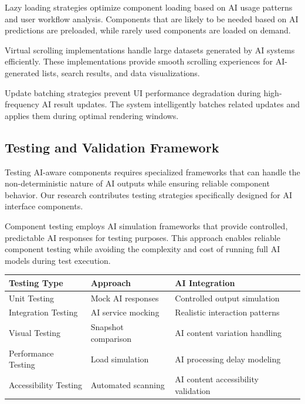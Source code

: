 Lazy loading strategies optimize component loading based on AI usage patterns and user workflow analysis. Components that are likely to be needed based on AI predictions are preloaded, while rarely used components are loaded on demand.

Virtual scrolling implementations handle large datasets generated by AI systems efficiently. These implementations provide smooth scrolling experiences for AI-generated lists, search results, and data visualizations.

Update batching strategies prevent UI performance degradation during high-frequency AI result updates. The system intelligently batches related updates and applies them during optimal rendering windows.

\subsection*{Testing and Validation Framework}

Testing AI-aware components requires specialized frameworks that can handle the non-deterministic nature of AI outputs while ensuring reliable component behavior. Our research contributes testing strategies specifically designed for AI interface components.

Component testing employs AI simulation frameworks that provide controlled, predictable AI responses for testing purposes. This approach enables reliable component testing while avoiding the complexity and cost of running full AI models during test execution.

\begin{center}
\begin{tabular}{@{}lll@{}}
\toprule
\textbf{Testing Type} & \textbf{Approach} & \textbf{AI Integration} \\
\midrule
Unit Testing & Mock AI responses & Controlled output simulation \\
Integration Testing & AI service mocking & Realistic interaction patterns \\
Visual Testing & Snapshot comparison & AI content variation handling \\
Performance Testing & Load simulation & AI processing delay modeling \\
Accessibility Testing & Automated scanning & AI content accessibility validation \\
\bottomrule
\end{tabular}
\end{center}

